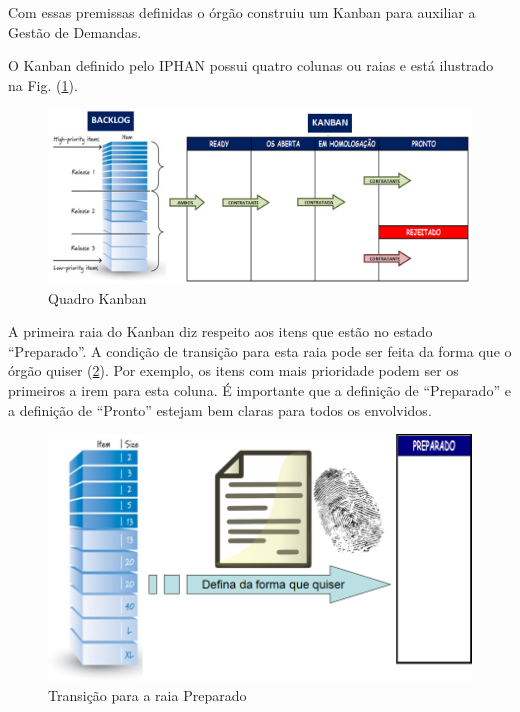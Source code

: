 Com essas premissas definidas o órgão construiu um Kanban para auxiliar a Gestão de Demandas. 

O Kanban definido pelo IPHAN possui quatro colunas ou raias e está ilustrado na Fig. (\ref{kanban1}).

\begin{figure}[H]
		\centering
		
			\includegraphics[scale=0.5]{figuras/kanbanIPHAN1.png}
		\caption{Quadro Kanban  \cite{parente}}
	\label{kanban1}
\end{figure}

A primeira raia do Kanban diz respeito aos itens que estão no estado “Preparado”. A condição de transição para esta raia pode ser feita da forma que o órgão quiser (\ref{kanban2}). Por exemplo, os itens com mais prioridade podem ser os primeiros a irem para esta coluna. É importante que a definição de “Preparado” e a definição de “Pronto” estejam bem claras para todos os envolvidos.

\begin{figure}[H]
		\centering
		
			\includegraphics[scale=0.5]{figuras/kanbanIPHAN2.png}
		\caption{Transição para a raia Preparado \cite{parente}}
		\label{kanban2}
\end{figure}

